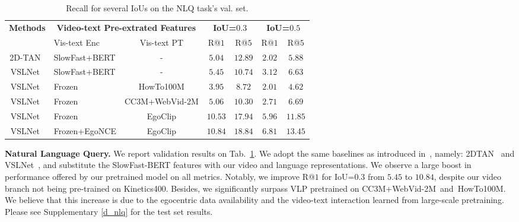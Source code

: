 \documentclass{article}
\newcommand{\dataset}{EgoClip}
\newcommand{\model}{EgoNCE\xspace}
\newcommand{\nlq}{Natural Language Query}
\newcommand{\ccweb}{CC3M+WebVid-2M}
\newcommand{\howto}{HowTo100M}
\begin{document}
\begin{table}[b]
\small
\centering
\vspace{-1.em}
\setlength{\tabcolsep}{3pt}
\begin{tabular}{clc|cccc}
	\toprule
	\textbf{Methods} & \multicolumn{2}{c|}{\textbf{Video-text Pre-extrated Features}} & \multicolumn{2}{c}{\textbf{IoU=$0.3$}} & \multicolumn{2}{c}{\textbf{IoU=$0.5$}} \\
	& Vis-text Enc & Vis-text PT & R@$1$ & R@$5$ & R@$1$ & R@$5$ \\  \midrule[1pt] 
	2D-TAN~\cite{zhang2020learning} &  SlowFast+BERT& - & $5.04$ & $12.89$ & $2.02$ & $5.88$   \\
	VSLNet~\cite{zhang2020span}  &  SlowFast+BERT   & - & $5.45$ & $10.74$ & $3.12$ & $6.63$  \\  
	 \midrule
 	VSLNet~\cite{zhang2020span}  &  Frozen       & \howto        & $3.95$ & $8.72$  & $2.01$ & $4.62$ \\	
	VSLNet~\cite{zhang2020span}  &  Frozen       & \ccweb & $5.06$ & $10.30$ & $2.71$ & $6.69$ \\		
	VSLNet~\cite{zhang2020span}  &  Frozen       & \dataset      & \underline{$10.53$} & \underline{$17.94$} & \underline{$5.96$} & \underline{$11.85$}\\
	VSLNet~\cite{zhang2020span}  &  Frozen+\model& \dataset      & $\mathbf{10.84}$ & $\mathbf{18.84}$ & $\mathbf{6.81}$ & $\mathbf{13.45}$ \\	
	\bottomrule
\end{tabular}
\vspace{.5em}
\centering
\caption{Recall for several IoUs on the NLQ task's val. set.}
\vspace{-1em}
\label{nlq}
\end{table}
%
 \textbf{\nlq.}
We report validation results on Tab.~\ref{nlq}. 
We adopt the same baselines as introduced
in~\cite{grauman2021ego4d}, namely: 2DTAN~\cite{zhang2020learning} and VSLNet~\cite{zhang2020span}, and substitute the SlowFast-BERT features with our video and language representations.
We observe a large boost in performance offered by our pretrained model on all metrics. Notably, we improve R@$1$ for IoU=$0.3$ from $5.45$ to $10.84$, despite our video branch not being pre-trained on Kinetics400.
Besides, we significantly surpass VLP pretrained on \ccweb~and~\howto.
We believe that this increase is due to the egocentric data availability and the video-text interaction learned from large-scale pretraining. 
Please see Supplementary \ref{d_nlq} for the test set results.
\end{document}

